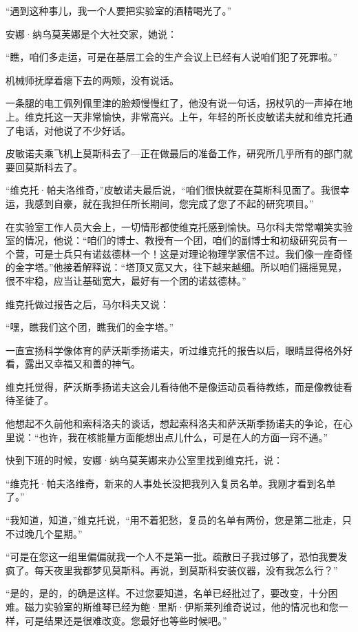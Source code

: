 “遇到这种事儿，我一个人要把实验室的酒精喝光了。”

安娜·纳乌莫芙娜是个大社交家，她说：

“瞧，咱们多走运，可是在基层工会的生产会议上已经有人说咱们犯了死罪啦。”

机械师抚摩着瘪下去的两颊，没有说话。

一条腿的电工佩列佩里津的脸颊慢慢红了，他没有说一句话，拐杖叭的一声掉在地上。维克托这一天非常愉快，非常高兴。上午，年轻的所长皮敏诺夫就和维克托通了电话，对他说了不少好话。

皮敏诺夫乘飞机上莫斯科去了—正在做最后的准备工作，研究所几乎所有的部门就要回莫斯科去了。

“维克托·帕夫洛维奇，”皮敏诺夫最后说，“咱们很快就要在莫斯科见面了。我很幸运，我感到自豪，就在我担任所长期间，您完成了您了不起的研究项目。”

在实验室工作人员大会上，一切情形都使维克托感到愉快。马尔科夫常常嘲笑实验室的情况，他说：“咱们的博士、教授有一个团，咱们的副博士和初级研究员有一个营，可是士兵只有诺兹德林一个！这是对理论物理学家信不过。我们像一座奇怪的金字塔。”他接着解释说：“塔顶又宽又大，往下越来越细。所以咱们摇摇晃晃，很不牢稳，应当让基础宽大，最好有一个团的诺兹德林。”

维克托做过报告之后，马尔科夫又说：

“嘿，瞧我们这个团，瞧我们的金字塔。”

一直宣扬科学像体育的萨沃斯季扬诺夫，听过维克托的报告以后，眼睛显得格外好看，露出又幸福又和善的神气。

维克托觉得，萨沃斯季扬诺夫这会儿看待他不是像运动员看待教练，而是像教徒看待圣徒了。

他想起不久前他和索科洛夫的谈话，想起索科洛夫和萨沃斯季扬诺夫的争论，在心里说：“也许，我在核能量方面能想出点儿什么，可是在人的方面一窍不通。”

快到下班的时候，安娜·纳乌莫芙娜来办公室里找到维克托，说：

“维克托·帕夫洛维奇，新来的人事处长没把我列入复员名单。我刚才看到名单了。”

“我知道，知道，”维克托说，“用不着犯愁，复员的名单有两份，您是第二批走，只不过晚几个星期。”

“可是在您这一组里偏偏就我一个人不是第一批。疏散日子我过够了，恐怕我要发疯了。每天夜里我都梦见莫斯科。再说，到莫斯科安装仪器，没有我怎么行？”

“是的，是的，的确是这样。不过您要知道，名单已经批过了，要改变，十分困难。磁力实验室的斯维琴已经为鲍·里斯·伊斯莱列维奇说过，他的情况也和您一样，可是结果还是很难改变。您最好也等些时候吧。”

